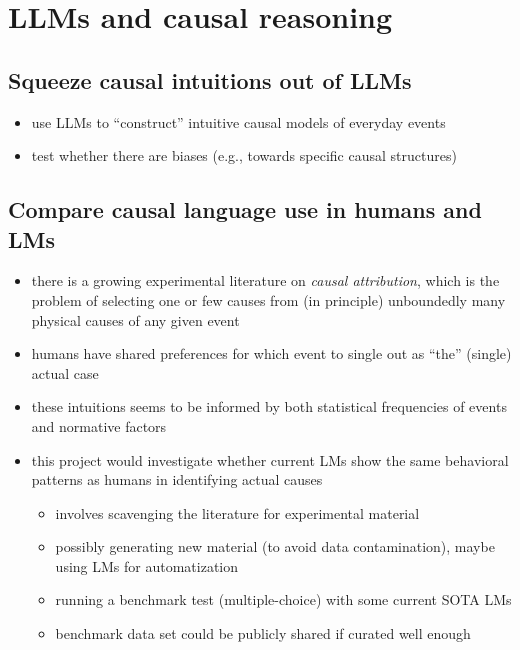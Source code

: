 \documentclass[fleqn,reqno,10pt]{article}
\begin{document}

\section{LLMs and causal reasoning}

\subsection{Squeeze causal intuitions out of LLMs}

\begin{itemize}
  \item use LLMs to ``construct'' intuitive causal models of everyday events
  \item test whether there are biases (e.g., towards specific causal structures)
\end{itemize}


\subsection{Compare causal language use in humans and LMs}

\begin{itemize}
  \item there is a growing experimental literature on \emph{causal attribution}, which is the problem of selecting one or few causes from (in principle) unboundedly many physical causes of any given event
  \item humans have shared preferences for which event to single out as ``the'' (single) actual case
  \item these intuitions seems to be informed by both statistical frequencies of events and normative factors \citep{IcardKominsky2017:Normality-and-a,QuillienLucas2023:Counterfactuals}
  \item this project would investigate whether current LMs show the same behavioral patterns as humans in identifying actual causes
  \begin{itemize}
    \item involves scavenging the literature for experimental material
    \item possibly generating new material (to avoid data contamination), maybe using LMs for automatization
    \item running a benchmark test (multiple-choice) with some current SOTA LMs
    \item benchmark data set could be publicly shared if curated well enough
  \end{itemize}
\end{itemize}
\end{document}
